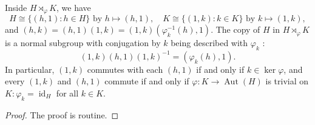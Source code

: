 \begin{theorem}[Theorem 3.7]
Inside $H \rtimes_{\varphi} K$, we have
\[
H \cong\{(h, 1): h \in H\} \text { by } h \mapsto(h, 1), \quad K \cong\{(1, k): k \in K\} \text { by } k \mapsto(1, k),
\]and $(h, k)=(h, 1)(1, k)=(1, k)\left(\varphi_k^{-1}(h), 1\right)$. The copy of $H$ in $H \rtimes_{\varphi} K$ is a normal subgroup with conjugation by $k$ being described with $\varphi_k$ :
\[
(1, k)(h, 1)(1, k)^{-1}=\left(\varphi_k(h), 1\right) .
\]In particular, $(1, k)$ commutes with each $(h, 1)$ if and only if $k \in \operatorname{ker} \varphi$, and every $(1, k)$ and $(h, 1)$ commute if and only if $\varphi: K \rightarrow \operatorname{Aut}(H)$ is trivial on $K: \varphi_k=\operatorname{id}_H$ for all $k \in K$.\label{6742ba}
\end{theorem}\begin{proof}
The proof is routine.
\end{proof}


